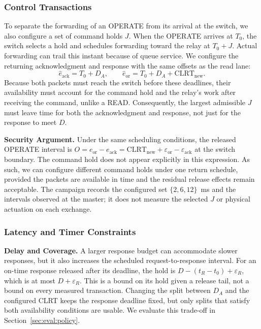 \subsubsection{Control Transactions}
\label{sec:design:control}

To separate the forwarding of an OPERATE from its arrival at the switch, we also configure a set
of command holds $J$. When the OPERATE arrives at $T_0$, the switch selects a hold and schedules
forwarding toward the relay at $T_0+J$. Actual forwarding can trail this instant because of queue
service. We configure the returning acknowledgment and response with the same offsets as the read
lane:
\begin{equation}
\label{eq:control}
\hat{e}_{\mathrm{ack}}=T_0+D_A, \qquad
\hat{e}_{\mathrm{or}}=T_0+D_A+\mathrm{CLRT}_{\mathrm{new}}.
\end{equation}
Because both packets must reach the switch before these deadlines, their availability must account
for the command hold and the relay's work after receiving the command, unlike a READ. Consequently, the
largest admissible $J$ must leave time for both the acknowledgment and response, not just for the
response to meet $D$.

\textbf{Security Argument.} Under the same scheduling conditions, the released OPERATE interval
is $O=e_{\mathrm{or}}-e_{\mathrm{ack}}=\mathrm{CLRT}_{\mathrm{new}}+
\varepsilon_{\mathrm{or}}-\varepsilon_{\mathrm{ack}}$ at the switch boundary. The command hold does
not appear explicitly in this expression. As such, we can configure different command holds under one return schedule, provided the packets
are available in time and the residual release effects remain acceptable. The campaign
records the configured set $\{2,6,12\}$~ms and the intervals observed at the master; it does not
measure the selected $J$ or physical actuation on each exchange.

\subsubsection{Latency and Timer Constraints}
\label{sec:design:overhead}

\textbf{Delay and Coverage.} A larger response budget can accommodate slower responses, but it
also increases the scheduled request-to-response interval. For an on-time response released after
its deadline, the hold is $D-(t_R-t_0)+\varepsilon_R$, which is at most $D+\varepsilon_R$.
This is a bound on its hold given a release tail, not a bound on every measured transaction.
Changing the split between $D_A$ and the configured CLRT keeps the response deadline fixed, but
only splits that satisfy both availability conditions are usable. We evaluate this trade-off in
Section~\ref{sec:eval:policy}.

